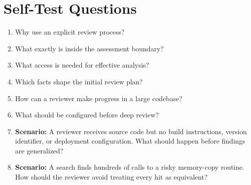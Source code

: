 \documentclass[11pt,letterpaper]{article}
\begin{document}
\section{Self-Test Questions}
\begin{enumerate}
\item Why use an explicit review process?
\item What exactly is inside the assessment boundary?
\item What access is needed for effective analysis?
\item Which facts shape the initial review plan?
\item How can a reviewer make progress in a large codebase?
\item What should be configured before deep review?
\item \textbf{Scenario:} A reviewer receives source code but no build instructions, version identifier, or deployment configuration. What should happen before findings are generalized?
\item \textbf{Scenario:} A search finds hundreds of calls to a risky memory-copy routine. How should the reviewer avoid treating every hit as equivalent?
\end{enumerate}
\clearpage
\end{document}
